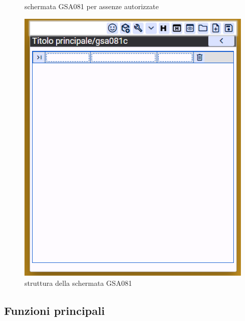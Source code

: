 \documentclass[target=bach,aauheader=,style=]{thud}
\begin{document}
\begin{figure}[h]
\begin{minipage}{0.3\textwidth}
        \caption{schermata GSA081 per assenze autorizzate}
    \end{minipage}
    \hfill
    \begin{minipage}{0.3\textwidth}
        \centering
        \includegraphics[width=\linewidth]{screenshot/Struttura_gsa081.png}
        \caption{struttura della schermata GSA081}
    \end{minipage}
\end{figure}

\break
\subsection{Funzioni principali}
\end{document}
